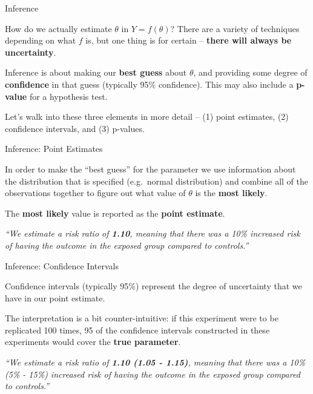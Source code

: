 \documentclass[ignorenonframetext,]{beamer}
\begin{document}
\begin{frame}{Inference}
\protect\hypertarget{inference}{}

How do we actually estimate \(\theta\) in \(Y = f(\theta)\)? There are a
variety of techniques depending on what \(f\) is, but one thing is for
certain -- \textbf{there will always be uncertainty}.

Inference is about making our \textbf{best guess} about \(\theta\), and
providing some degree of \textbf{confidence} in that guess (typically
95\% confidence). This may also include a \textbf{p-value} for a
hypothesis test.

Let's walk into these three elements in more detail -- (1) point
estimates, (2) confidence intervals, and (3) p-values.

\end{frame}

\begin{frame}{Inference: Point Estimates}
\protect\hypertarget{inference-point-estimates}{}

In order to make the ``best guess'' for the parameter we use information
about the distribution that is specified (e.g.~normal distribution) and
combine all of the observations together to figure out what value of
\(\theta\) is the \textbf{most likely}.

The \textbf{most likely} value is reported as the \textbf{point
estimate}.

\emph{``We estimate a risk ratio of \textbf{1.10}, meaning that there
was a 10\% increased risk of having the outcome in the exposed group
compared to controls.''}

\end{frame}

\begin{frame}{Inference: Confidence Intervals}
\protect\hypertarget{inference-confidence-intervals}{}

Confidence intervals (typically 95\%) represent the degree of
uncertainty that we have in our point estimate.

The interpretation is a bit counter-intuitive: if this experiment were
to be replicated 100 times, 95 of the confidence intervals constructed
in these experiments would cover the \textbf{true parameter}.

\emph{``We estimate a risk ratio of \textbf{1.10 (1.05 - 1.15)}, meaning
that there was a 10\% (5\% - 15\%) increased risk of having the outcome
in the exposed group compared to controls.''}

\end{frame}
\end{document}

